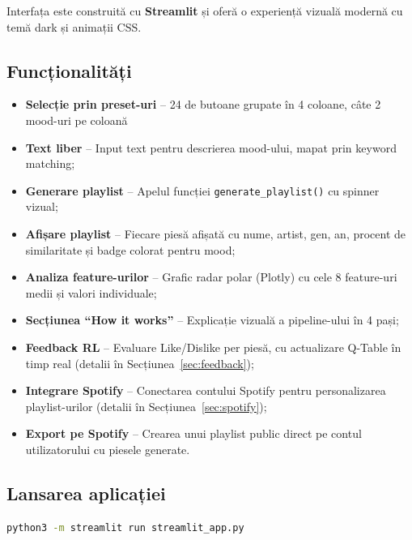\documentclass[12pt,a4paper]{article}
\begin{document}
Interfața este construită cu \textbf{Streamlit} \cite{streamlit} și oferă o experiență vizuală modernă cu temă dark și animații CSS.

\subsection{Funcționalități}

\begin{itemize}
    \item \textbf{Selecție prin preset-uri} -- 24 de butoane grupate în 4 coloane, câte 2 mood-uri pe coloană
    \item \textbf{Text liber} -- Input text pentru descrierea mood-ului, mapat prin keyword matching;
    \item \textbf{Generare playlist} -- Apelul funcției \texttt{generate\_playlist()} cu spinner vizual;
    \item \textbf{Afișare playlist} -- Fiecare piesă afișată cu nume, artist, gen, an, procent de similaritate și badge colorat pentru mood;
    \item \textbf{Analiza feature-urilor} -- Grafic radar polar (Plotly) cu cele 8 feature-uri medii și valori individuale;
    \item \textbf{Secțiunea ``How it works''} -- Explicație vizuală a pipeline-ului în 4 pași;
    \item \textbf{Feedback RL} -- Evaluare Like/Dislike per piesă, cu actualizare Q-Table în timp real (detalii în Secțiunea~\ref{sec:feedback});
    \item \textbf{Integrare Spotify} -- Conectarea contului Spotify pentru personalizarea playlist-urilor (detalii în Secțiunea~\ref{sec:spotify});
    \item \textbf{Export pe Spotify} -- Crearea unui playlist public direct pe contul utilizatorului cu piesele generate.
\end{itemize}

\subsection{Lansarea aplicației}

\begin{lstlisting}[language=bash, caption={Comanda de lansare}]
python3 -m streamlit run streamlit_app.py
\end{lstlisting}

\FloatBarrier

\end{document}
